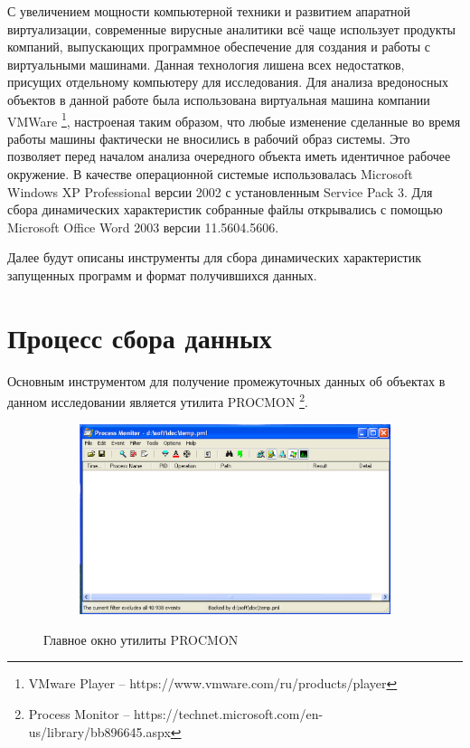 С увеличением мощности компьютерной техники и развитием апаратной виртуализации, современные вирусные аналитики всё чаще использует продукты компаний, выпускающих программное обеспечение для создания и работы с виртуальными машинами. 
Данная технология лишена всех недостатков, присущих отдельному компьютеру для исследования.
Для анализа вредоносных объектов в данной работе была использована виртуальная машина компании VMWare \footnote{VMware Player -- https://www.vmware.com/ru/products/player}, настроеная таким образом, что любые изменение сделанные во время работы машины фактически не вносились в рабочий образ системы.
Это позволяет перед началом анализа очередного объекта иметь идентичное рабочее окружение.
В качестве операционной системые использовалась Microsoft Windows XP Professional версии 2002 с установленным Service Pack 3.
Для сбора динамических характеристик собранные файлы открывались с помощью Microsoft Office Word 2003 версии 11.5604.5606.

Далее будут описаны инструменты для сбора динамических характеристик запущенных программ и формат получившихся данных.

\section{Процесс сбора данных}

Основным инструментом для получение промежуточных данных об объектах в данном исследовании является утилита PROCMON \footnote{Process Monitor -- https://technet.microsoft.com/en-us/library/bb896645.aspx}.

\begin{figure}[ht]
	\centering
    \begin{subfigure}[b]{1\textwidth}
    \centering
        \includegraphics[scale=0.5]{procmon_main_window.png}        
    \end{subfigure}
 
    \caption{Главное окно утилиты PROCMON}
    \label{fig_parsetree}
\end{figure}

